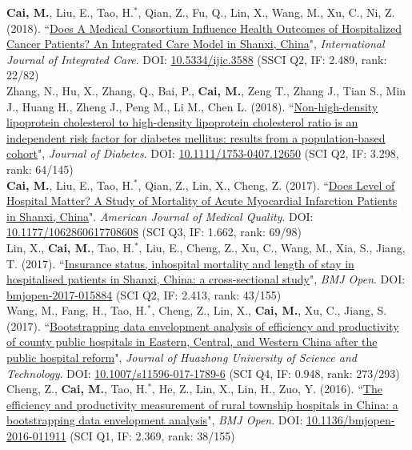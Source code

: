 \documentclass[11pt, a4paper]{article}
\newcommand{\years}[1]{\marginnote{\scriptsize #1}}
\begin{document}
\years{2018}\textbf{Cai, M.}, Liu, E., Tao, H.$^\ast$, Qian, Z., Fu, Q., Lin, X., Wang, M., Xu, C., Ni, Z. (2018). ``\ul{Does A Medical Consortium Influence Health Outcomes of Hospitalized Cancer Patients? An Integrated Care Model in Shanxi, China}", \emph{International Journal of Integrated Care}. DOI: \href{https://doi.org/10.5334/ijic.3588}{10.5334/ijic.3588} (SSCI Q2, IF: 2.489, rank: 22/82)\\
\years{2018}Zhang, N., Hu, X., Zhang, Q., Bai, P., \textbf{Cai, M.}, Zeng T., Zhang J., Tian S., Min J., Huang H., Zheng J., Peng M., Li M., Chen L. (2018). ``\ul{Non-high-density lipoprotein cholesterol to high-density lipoprotein cholesterol ratio is an independent risk factor for diabetes mellitus: results from a population-based cohort}", \emph{Journal of Diabetes}. DOI: \href{https://doi.org/10.1111/1753-0407.12650}{10.1111/1753-0407.12650} (SCI Q2, IF: 3.298, rank: 64/145)\\
\years{2017}\textbf{Cai, M.}, Liu, E., Tao, H.$^\ast$, Qian, Z., Lin, X., Cheng, Z. (2017). ``\ul{Does Level of Hospital Matter? A Study of Mortality of Acute Myocardial Infarction Patients in Shanxi, China}". \emph{American Journal of Medical Quality}. DOI: \href{https://doi.org/10.1177/1062860617708608}{10.1177/1062860617708608} (SCI Q3, IF: 1.662, rank: 69/98)\\
\years{2017}Lin, X., \textbf{Cai, M.}, Tao, H.$^\ast$, Liu, E., Cheng, Z., Xu, C., Wang, M., Xia, S., Jiang, T. (2017). ``\ul{Insurance status, inhospital mortality and length of stay in hospitalised patients in Shanxi, China: a cross-sectional study}", \emph{BMJ Open}. DOI: \href{https://doi.org/10.1136/bmjopen-2017-015884}{bmjopen-2017-015884} (SCI Q2, IF: 2.413, rank: 43/155)\\
\years{2017}Wang, M., Fang, H., Tao, H.$^\ast$, Cheng, Z., Lin, X., \textbf{Cai, M.}, Xu, C., Jiang, S. (2017). ``\ul{Bootstrapping data envelopment analysis of efficiency and productivity of county public hospitals in Eastern, Central, and Western China after the public hospital reform}", \emph{Journal of Huazhong University of Science and Technology}. DOI: \href{https://doi.org/10.1007/s11596-017-1789-6}{10.1007/s11596-017-1789-6} (SCI Q4, IF: 0.948, rank: 273/293)\\
\years{2016}Cheng, Z., \textbf{Cai, M.}, Tao, H.$^\ast$, He, Z., Lin, X., Lin, H., Zuo, Y. (2016). ``\ul{The efficiency and productivity measurement of rural township hospitals in China: a bootstrapping data envelopment analysis}", \emph{BMJ Open}. DOI: \href{https://doi.org/10.1136/bmjopen-2016-011911}{10.1136/bmjopen-2016-011911} (SCI Q1, IF: 2.369, rank: 38/155)\\
\end{document}
